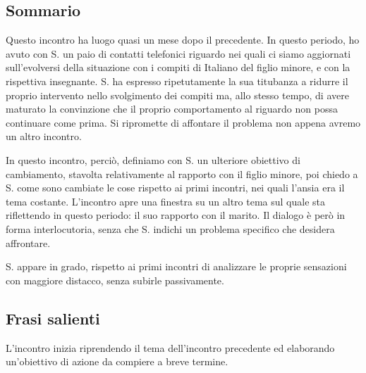 \subsection*{Sommario}
Questo incontro ha luogo quasi un mese dopo il precedente. In questo periodo, ho avuto con S. un paio di contatti telefonici riguardo nei quali ci siamo aggiornati sull'evolversi della situazione con i compiti di Italiano del figlio minore, e con la rispettiva insegnante. S. ha espresso ripetutamente la sua titubanza a ridurre il proprio intervento nello svolgimento dei compiti ma, allo stesso tempo, di avere maturato la convinzione che il proprio comportamento al riguardo non possa continuare come prima. Si ripromette di affontare il problema non appena avremo un altro incontro.

In questo incontro, perciò, definiamo con S. un ulteriore obiettivo di cambiamento, stavolta relativamente al rapporto con il figlio minore, poi chiedo a S. come sono cambiate le cose rispetto ai primi incontri, nei quali l'ansia era il tema costante.
L'incontro apre una finestra su un altro tema sul quale sta riflettendo in questo periodo: il suo rapporto con il marito. Il dialogo è però in forma interlocutoria, senza che S. indichi un problema specifico che desidera affrontare.

S. appare in grado, rispetto ai primi incontri di analizzare le proprie sensazioni con maggiore distacco, senza subirle passivamente. 

\subsection*{Frasi salienti}

L'incontro inizia riprendendo il tema dell'incontro precedente ed elaborando un'obiettivo di azione da compiere a breve termine.

